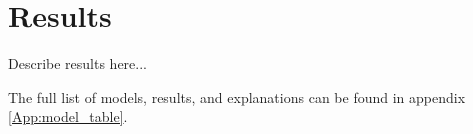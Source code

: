 \chapter{Results}
Describe results here...

The full list of models, results, and explanations can be found in appendix \ref{App:model_table}.
